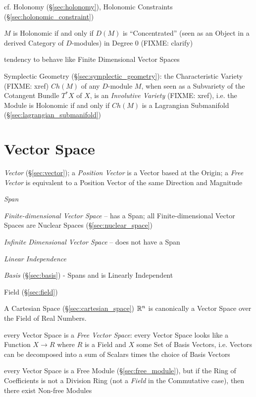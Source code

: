 \fist cf. Holonomy (\S\ref{sec:holonomy}), Holonomic Constraints
(\S\ref{sec:holonomic_constraint})

$M$ is Holonomic if and only if $D(M)$ is ``Concentrated'' (seen as an Object
in a derived Category of $D$-modules) in Degree $0$ (FIXME: clarify)

tendency to behave like Finite Dimensional Vector Spaces

\fist Symplectic Geometry (\S\ref{sec:symplectic_geometry}): the Characteristic
Variety (FIXME: xref) $Ch(M)$ of any $D$-module $M$, when seen as a Subvariety
of the Cotangent Bundle $T^*X$ of $X$, is an \emph{Involutive Variety} (FIXME:
xref), i.e. the Module is Holonomic if and only if $Ch(M)$ is a Lagrangian
Submanifold (\S\ref{sec:lagrangian_submanifold})



\section{Vector Space}\label{sec:vector_space}

\emph{Vector} (\S\ref{sec:vector}); a \emph{Position Vector} is a Vector based
at the Origin; a \emph{Free Vector} is equivalent to a Position Vector of the
same Direction and Magnitude

\emph{Span}

\emph{Finite-dimensional Vector Space} -- has a Span; all
Finite-dimensional Vector Spaces are Nuclear Spaces
(\S\ref{sec:nuclear_space})

\emph{Infinite Dimensional Vector Space} -- does not have a Span

\emph{Linear Independence}

\emph{Basis} (\S\ref{sec:basis}) - Spans and is Linearly Independent

Field (\S\ref{sec:field})

A Cartesian Space (\S\ref{sec:cartesian_space}) $\mathbb{R}^n$ is canonically a
Vector Space over the Field of Real Numbers.

every Vector Space is a \emph{Free Vector Space}: every Vector Space
looks like a Function $X \rightarrow R$ where $R$ is a Field and $X$
some Set of Basis Vectors, i.e. Vectors can be decomposed into a sum
of Scalars times the choice of Basis Vectors %

every Vector Space is a Free Module (\S\ref{sec:free_module}), but if the Ring
of Coefficients is not a Division Ring (not a \emph{Field} in the Commutative
case), then there exist Non-free Modules

